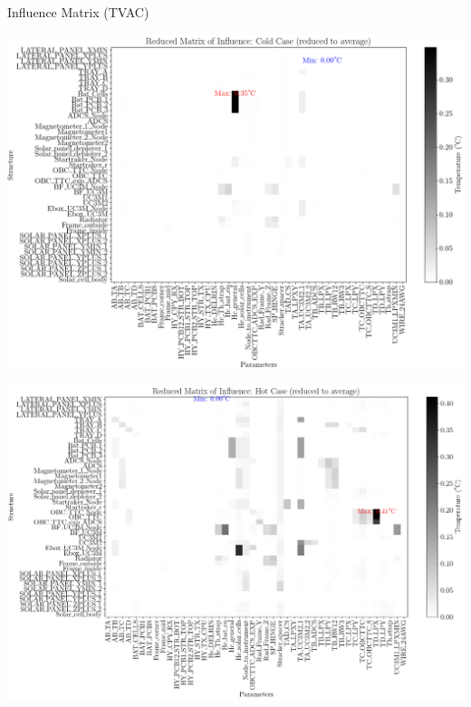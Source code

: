\documentclass{cubeamer}
\begin{document}
\begin{frame}{Influence Matrix (TVAC)}
\begin{center}
    \begin{minipage}{0.475\textwidth}
    \includegraphics[width=1\linewidth]{Figures/TVAC/infmatCC.png}
\end{minipage}
\begin{minipage}{0.475\textwidth}
    \includegraphics[width=1\linewidth]{Figures/TVAC/infmatHC.png}
\end{minipage}
\end{center}

\end{frame}
\end{document}
